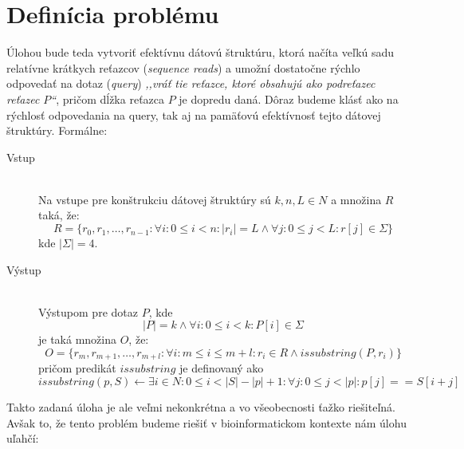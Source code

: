 
\section{Definícia problému}

Úlohou bude teda vytvoriť efektívnu dátovú štruktúru, ktorá načíta veľkú sadu
relatívne krátkych reťazcov (\emph{sequence reads}) a umožní dostatočne rýchlo
odpovedať na dotaz (\emph{query}) \emph{,,vráť tie reťazce, ktoré obsahujú ako
podreťazec reťazec $P$``}, pričom dĺžka reťazca $P$ je dopredu daná. Dôraz
budeme klásť ako na rýchlosť odpovedania na query, tak aj na pamäťovú
efektívnosť tejto dátovej štruktúry. Formálne:

\begin{description}
    \item[Vstup] \hfill \\
        Na vstupe pre konštrukciu dátovej štruktúry sú $k, n, L \in N$ a množina
        $R$ taká, že:
        $$R = \{r_0, r_1, \ldots, r_{n-1} :
        \forall i : 0 \leq i < n : |r_i| = L \wedge \forall j : 0 \leq
        j < L : r[j] \in \Sigma \}$$ kde $|\Sigma| = 4$.
    \item[Výstup] \hfill \\
        Výstupom pre dotaz $P$, kde $$|P| = k \wedge \forall i : 0 \leq i < k :
        P[i] \in \Sigma$$ je taká množina $O$, že: 
        $$O = \{r_m, r_{m+1}, \ldots, r_{m+l} : \forall i : m \leq i \leq m +
        l : r_i \in R \wedge issubstring(P, r_i) \}$$ pričom predikát
        $issubstring$ je definovaný ako $$issubstring(p, S) \leftarrow \exists i
        \in N: 0 \leq i < |S| - |p| + 1 : \forall j : 0 \leq j < |p| : p[j] ==
        S[i+j] $$        
\end{description}

Takto zadaná úloha je ale veľmi nekonkrétna a vo všeobecnosti ťažko riešiteľná.
Avšak to, že tento problém budeme riešiť v bioinformatickom kontexte nám úlohu
uľahčí:


